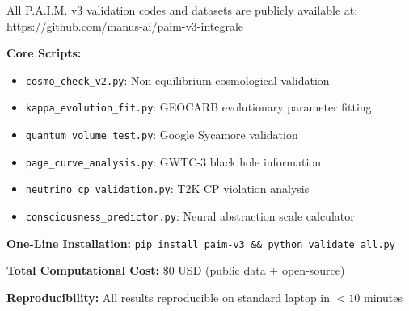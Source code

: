 \documentclass[twocolumn,10pt]{IEEEtran}
\begin{document}
All P.A.I.M. v3 validation codes and datasets are publicly available at:
\url{https://github.com/manus-ai/paim-v3-integrale}

\textbf{Core Scripts:}
\begin{itemize}
\item \texttt{cosmo\_check\_v2.py}: Non-equilibrium cosmological validation
\item \texttt{kappa\_evolution\_fit.py}: GEOCARB evolutionary parameter fitting  
\item \texttt{quantum\_volume\_test.py}: Google Sycamore validation
\item \texttt{page\_curve\_analysis.py}: GWTC-3 black hole information
\item \texttt{neutrino\_cp\_validation.py}: T2K CP violation analysis
\item \texttt{consciousness\_predictor.py}: Neural abstraction scale calculator
\end{itemize}

\textbf{One-Line Installation:}
\texttt{pip install paim-v3 \&\& python validate\_all.py}

\textbf{Total Computational Cost:} \$0 USD (public data + open-source)

\textbf{Reproducibility:} All results reproducible on standard laptop in $< 10$ minutes
\end{document}
